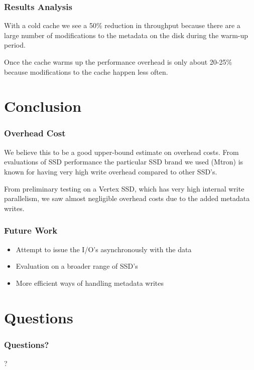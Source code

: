 \documentclass{beamer}
\begin{document}
\begin{frame}
  \frametitle{Results Analysis}

  With a cold cache we see a 50\% reduction in throughput because
  there are a large number of modifications to the metadata on the
  disk during the warm-up period.

  Once the cache warms up the performance overhead is only about
  20-25\% because modifications to the cache happen less often.

\end{frame}

\section{Conclusion}

\begin{frame}
  \frametitle{Overhead Cost}
  
  We believe this to be a good upper-bound estimate on overhead
  costs. From evaluations of SSD performance the particular SSD brand
  we used (Mtron) is known for having very high write overhead
  compared to other SSD's.

  From preliminary testing on a Vertex SSD, which has very high
  internal write parallelism, we saw almost negligible overhead costs
  due to the added metadata writes.

\end{frame}

\begin{frame}
  \frametitle{Future Work}

  \begin{itemize}
    \item Attempt to issue the I/O's asynchronously with the data
    \item Evaluation on a broader range of SSD's
    \item More efficient ways of handling metadata writes
  \end{itemize}

\end{frame}

\section{Questions}

\begin{frame}
  \frametitle{Questions?}
  \begin{center}
    \huge ?
  \end{center}
\end{frame}
\end{document}
